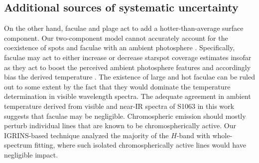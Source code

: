 \documentclass[trackchanges]{aastex631}
\begin{document}




\subsection{Additional sources of systematic uncertainty}
\label{sec:uncertainties}


On the other hand, faculae and plage act to add a hotter-than-average surface component. Our two-component model cannot accurately account for the coexistence of spots and faculae with an ambient photosphere \citep{1998A&A...329..747S}. Specifically, faculae may act to either increase or decrease starspot coverage estimates insofar as they act to boost the perceived ambient photosphere features and accordingly bias the derived temperature  \citep{2019AJ....157...11W}. The existence of large and hot faculae can be ruled out to some extent by the fact that they would dominate the temperature determination in visible wavelength spectra.  The adequate agreement in ambient temperature derived from visible \citep{mathieu03} and near-IR spectra of S1063 in this work suggests that faculae may be negligible.  Chromospheric emission should mostly perturb individual lines that are known to be chromospherically active.  Our IGRINS-based technique analyzed the majority of the $H$-band with whole-spectrum fitting, where such isolated chromospherically active lines would have negligible impact.
\end{document}
